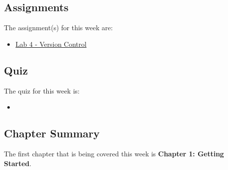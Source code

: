 \subsection{Assignments}

The assignment(s) for this week are:

\begin{itemize}
    \item \href{https://github.com/QuantumCompiler/CU/tree/main/CSPB%203308%20-%20Software%20Development%20Methods%20And%20Tools/Assignments/Assignment%204%20-%20Version%20Control}{Lab 4 - Version Control}
\end{itemize}

\subsection{Quiz}

The quiz for this week is:

\begin{itemize}
    \item {}
\end{itemize}

\newpage

\subsection{Chapter Summary}

The first chapter that is being covered this week is \textbf{Chapter 1: Getting Started}.

